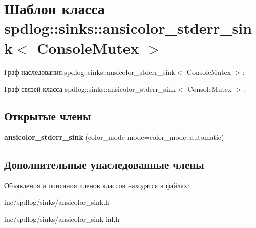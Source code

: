 \hypertarget{classspdlog_1_1sinks_1_1ansicolor__stderr__sink}{}\section{Шаблон класса spdlog\+:\+:sinks\+:\+:ansicolor\+\_\+stderr\+\_\+sink$<$ Console\+Mutex $>$}
\label{classspdlog_1_1sinks_1_1ansicolor__stderr__sink}


Граф наследования\+:spdlog\+:\+:sinks\+:\+:ansicolor\+\_\+stderr\+\_\+sink$<$ Console\+Mutex $>$\+:


Граф связей класса spdlog\+:\+:sinks\+:\+:ansicolor\+\_\+stderr\+\_\+sink$<$ Console\+Mutex $>$\+:
\subsection*{Открытые члены}
\begin{DoxyCompactItemize}
\item 
\mbox{\label{classspdlog_1_1sinks_1_1ansicolor__stderr__sink_a00a53780c4c3569add40c35640dccc7a}} 
{\bfseries ansicolor\+\_\+stderr\+\_\+sink} (color\+\_\+mode mode=color\+\_\+mode\+::automatic)
\end{DoxyCompactItemize}
\subsection*{Дополнительные унаследованные члены}


Объявления и описания членов классов находятся в файлах\+:\begin{DoxyCompactItemize}
\item 
inc/spdlog/sinks/ansicolor\+\_\+sink.\+h\item 
inc/spdlog/sinks/ansicolor\+\_\+sink-\/inl.\+h\end{DoxyCompactItemize}
